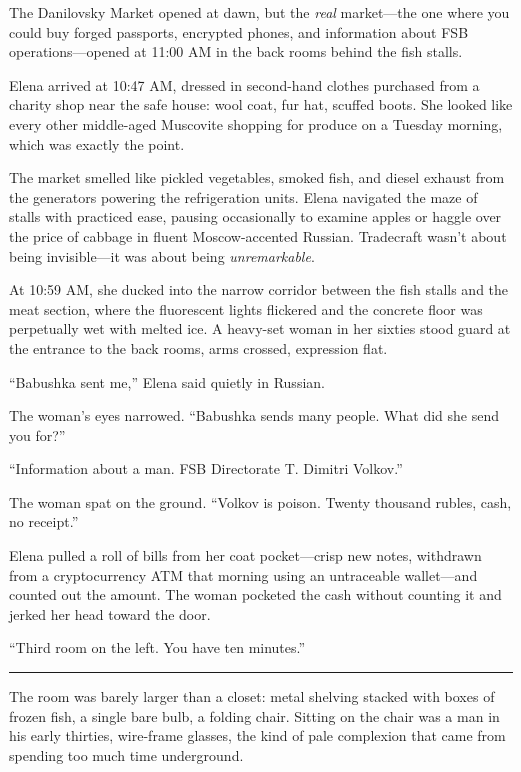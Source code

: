 The Danilovsky Market opened at dawn, but the \emph{real} market---the one where you could buy forged passports, encrypted phones, and information about FSB operations---opened at 11:00 AM in the back rooms behind the fish stalls.

Elena arrived at 10:47 AM, dressed in second-hand clothes purchased from a charity shop near the safe house: wool coat, fur hat, scuffed boots. She looked like every other middle-aged Muscovite shopping for produce on a Tuesday morning, which was exactly the point.

The market smelled like pickled vegetables, smoked fish, and diesel exhaust from the generators powering the refrigeration units. Elena navigated the maze of stalls with practiced ease, pausing occasionally to examine apples or haggle over the price of cabbage in fluent Moscow-accented Russian. Tradecraft wasn't about being invisible---it was about being \emph{unremarkable}.

At 10:59 AM, she ducked into the narrow corridor between the fish stalls and the meat section, where the fluorescent lights flickered and the concrete floor was perpetually wet with melted ice. A heavy-set woman in her sixties stood guard at the entrance to the back rooms, arms crossed, expression flat.

``Babushka sent me,'' Elena said quietly in Russian.

The woman's eyes narrowed. ``Babushka sends many people. What did she send you for?''

``Information about a man. FSB Directorate T. Dimitri Volkov.''

The woman spat on the ground. ``Volkov is poison. Twenty thousand rubles, cash, no receipt.''

Elena pulled a roll of bills from her coat pocket---crisp new notes, withdrawn from a cryptocurrency ATM that morning using an untraceable wallet---and counted out the amount. The woman pocketed the cash without counting it and jerked her head toward the door.

``Third room on the left. You have ten minutes.''

\begin{center}\rule{0.5\linewidth}{0.5pt}\end{center}

The room was barely larger than a closet: metal shelving stacked with boxes of frozen fish, a single bare bulb, a folding chair. Sitting on the chair was a man in his early thirties, wire-frame glasses, the kind of pale complexion that came from spending too much time underground.

